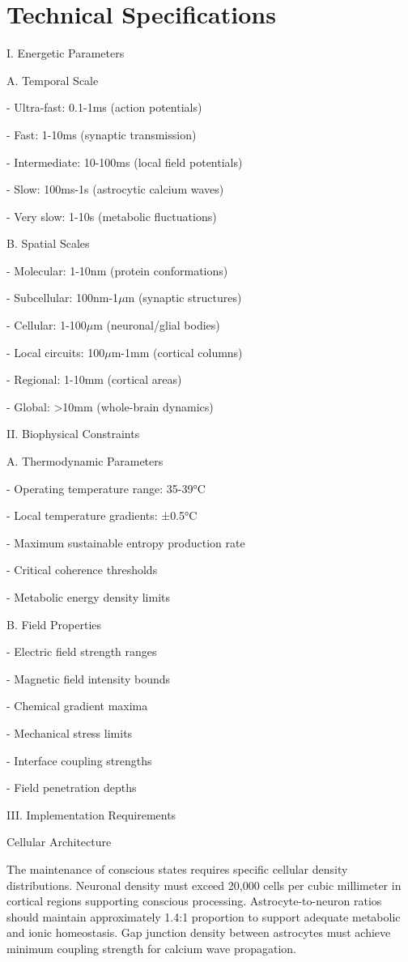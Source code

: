 \section{Technical Specifications}

I. Energetic Parameters

A. Temporal Scale

- Ultra-fast: 0.1-1ms (action potentials)

- Fast: 1-10ms (synaptic transmission)

- Intermediate: 10-100ms (local field potentials)

- Slow: 100ms-1s (astrocytic calcium waves)

- Very slow: 1-10s (metabolic fluctuations)

B. Spatial Scales

- Molecular: 1-10nm (protein conformations)

- Subcellular: 100nm-1$\mu$m (synaptic structures)

- Cellular: 1-100$\mu$m (neuronal/glial bodies)

- Local circuits: 100$\mu$m-1mm (cortical columns)

- Regional: 1-10mm (cortical areas)

- Global: >10mm (whole-brain dynamics)

II. Biophysical Constraints

A. Thermodynamic Parameters

- Operating temperature range: 35-39°C

- Local temperature gradients: ±0.5°C

- Maximum sustainable entropy production rate

- Critical coherence thresholds

- Metabolic energy density limits

B. Field Properties

- Electric field strength ranges

- Magnetic field intensity bounds

- Chemical gradient maxima

- Mechanical stress limits

- Interface coupling strengths

- Field penetration depths

III. Implementation Requirements

Cellular Architecture

The maintenance of conscious states requires specific cellular density distributions. Neuronal density must exceed 20,000 cells per cubic millimeter in cortical regions supporting conscious processing. Astrocyte-to-neuron ratios should maintain approximately 1.4:1 proportion to support adequate metabolic and ionic homeostasis. Gap junction density between astrocytes must achieve minimum coupling strength for calcium wave propagation.

